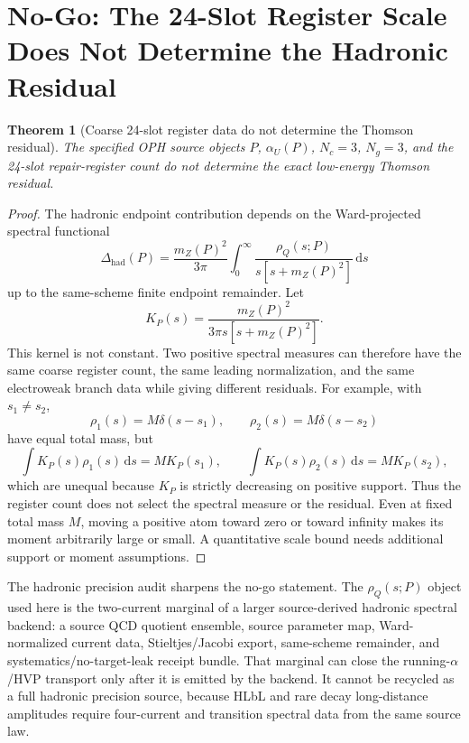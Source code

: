 \documentclass[11pt]{article}
\newtheorem{theorem}{Theorem}
\theoremstyle{remark}
\newcommand{\dd}{\,\mathrm d}
\begin{document}
\section{No-Go: The 24-Slot Register Scale Does Not Determine the Hadronic Residual}

\begin{theorem}[Coarse 24-slot register data do not determine the Thomson residual]
The specified OPH source objects \(P\), \(\alpha_U(P)\), \(N_c=3\), \(N_g=3\), and the
24-slot repair-register count do not determine the exact low-energy Thomson residual.
\end{theorem}

\begin{proof}
The hadronic endpoint contribution depends on the Ward-projected spectral functional
\begin{equation}
\Delta_{\mathrm{had}}(P)
=
\frac{m_Z(P)^2}{3\pi}
\int_0^\infty
\frac{\rho_Q(s;P)}{s[s+m_Z(P)^2]}\dd s
\label{eq:hadronkernelnogo}
\end{equation}
up to the same-scheme finite endpoint remainder. Let
\[
K_P(s)=\frac{m_Z(P)^2}{3\pi s[s+m_Z(P)^2]}.
\]
This kernel is not constant. Two positive spectral measures can therefore have the same coarse
register count, the same leading normalization, and the same electroweak branch data while giving
different residuals. For example, with \(s_1\ne s_2\),
\[
\rho_1(s)=M\delta(s-s_1),
\qquad
\rho_2(s)=M\delta(s-s_2)
\]
have equal total mass, but
\[
\int K_P(s)\rho_1(s)\dd s=M K_P(s_1),
\qquad
\int K_P(s)\rho_2(s)\dd s=M K_P(s_2),
\]
which are unequal because \(K_P\) is strictly decreasing on positive support.
Thus the register count does not select the spectral measure or the residual.
Even at fixed total mass \(M\), moving a positive atom toward zero or toward
infinity makes its moment arbitrarily large or small. A quantitative scale
bound needs additional support or moment assumptions.
\end{proof}

The hadronic precision audit sharpens the no-go statement. The
\(\rho_Q(s;P)\) object used here is the two-current marginal of a larger source-derived hadronic spectral
backend: a source QCD quotient ensemble, source parameter map, Ward-normalized current
data, Stieltjes/Jacobi export, same-scheme remainder, and systematics/no-target-leak receipt
bundle. That marginal can close the running-\(\alpha\)/HVP transport only after it is emitted by
the backend. It cannot be recycled as a full hadronic precision source, because HLbL and rare
decay long-distance amplitudes require four-current and transition spectral data from the same
source law.
\end{document}
